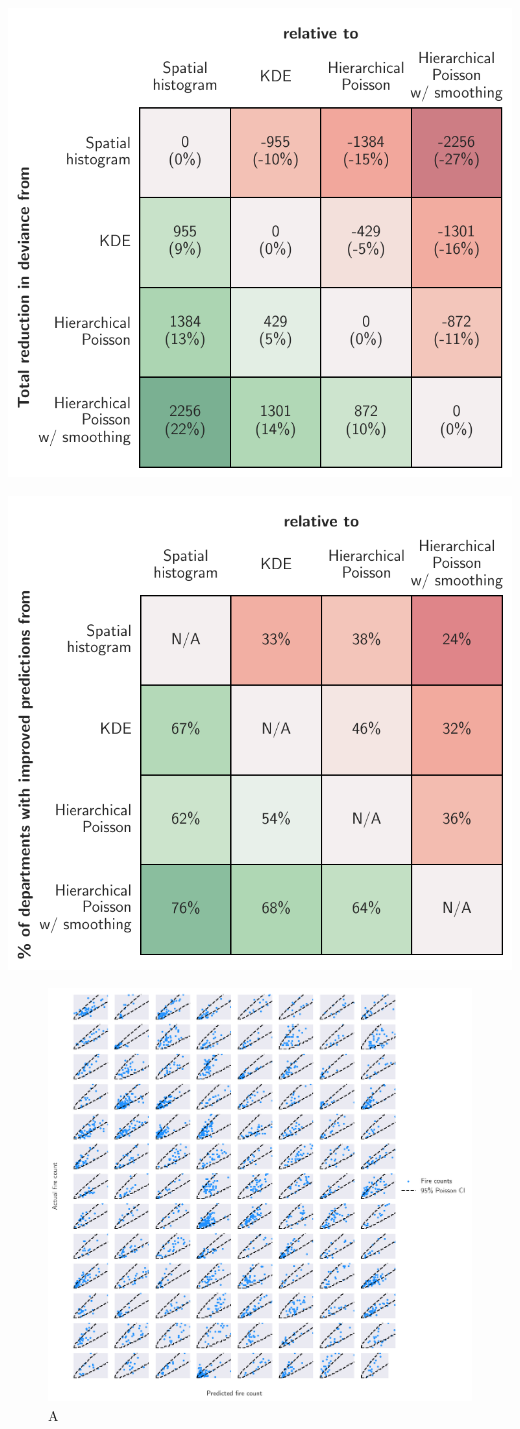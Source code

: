 \documentclass{svjour3}
\begin{document}
    \begin{table}[htb] \centering
    \includegraphics[width=.5\textwidth]{figures/dev_table.pdf}
    \caption{A }
    \label{table:dev_table}
    \end{table}
  
    \begin{table}[htb] \centering
    \includegraphics[width=.5\textwidth]{figures/department_comparison.pdf}
    \caption{A}
    \label{table:dep_comparison}
    \end{table}
  
  
  
    \begin{figure}[htb] \centering
    \includegraphics[width=1\textwidth]{figures/dispersion.pdf}
    \caption{A }
    \label{fig:dispersion}
    \end{figure}
  
\end{document}
